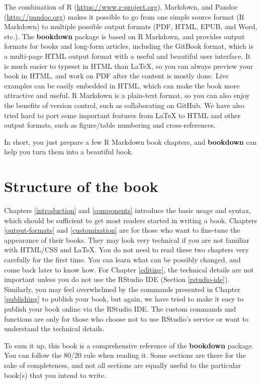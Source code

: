 \documentclass[12pt,]{krantz}
\begin{document}
The combination of R (\url{https://www.r-project.org}), Markdown, and Pandoc (\url{http://pandoc.org}) makes it possible to go from one simple source format (R Markdown) to multiple possible output formats (PDF, HTML, EPUB, and Word, etc.). The \textbf{bookdown} package is based on R Markdown, and provides output formats for books and long-form articles, including the GitBook format, which is a multi-page HTML output format with a useful and beautiful user interface. It is much easier to typeset in HTML than LaTeX, so you can always preview your book in HTML, and work on PDF after the content is mostly done. Live examples can be easily embedded in HTML, which can make the book more attractive and useful. R Markdown is a plain-text format, so you can also enjoy the benefits of version control, such as collaborating on GitHub. We have also tried hard to port some important features from LaTeX to HTML and other output formats, such as figure/table numbering and cross-references.

In short, you just prepare a few R Markdown book chapters, and \textbf{bookdown} can help you turn them into a beautiful book.

\hypertarget{structure-of-the-book}{%
\section*{Structure of the book}\label{structure-of-the-book}}


Chapters \ref{introduction} and \ref{components} introduce the basic usage and syntax, which should be sufficient to get most readers started in writing a book. Chapters \ref{output-formats} and \ref{customization} are for those who want to fine-tune the appearance of their books. They may look very technical if you are not familiar with HTML/CSS and LaTeX. You do not need to read these two chapters very carefully for the first time. You can learn what can be possibly changed, and come back later to know how. For Chapter \ref{editing}, the technical details are not important unless you do not use the RStudio IDE (Section \ref{rstudio-ide}). Similarly, you may feel overwhelmed by the commands presented in Chapter \ref{publishing} to publish your book, but again, we have tried to make it easy to publish your book online via the RStudio IDE. The custom commands and functions are only for those who choose not to use RStudio's service or want to understand the technical details.

To sum it up, this book is a comprehensive reference of the \textbf{bookdown} package. You can follow the 80/20 rule when reading it. Some sections are there for the sake of completeness, and not all sections are equally useful to the particular book(s) that you intend to write.
\end{document}
